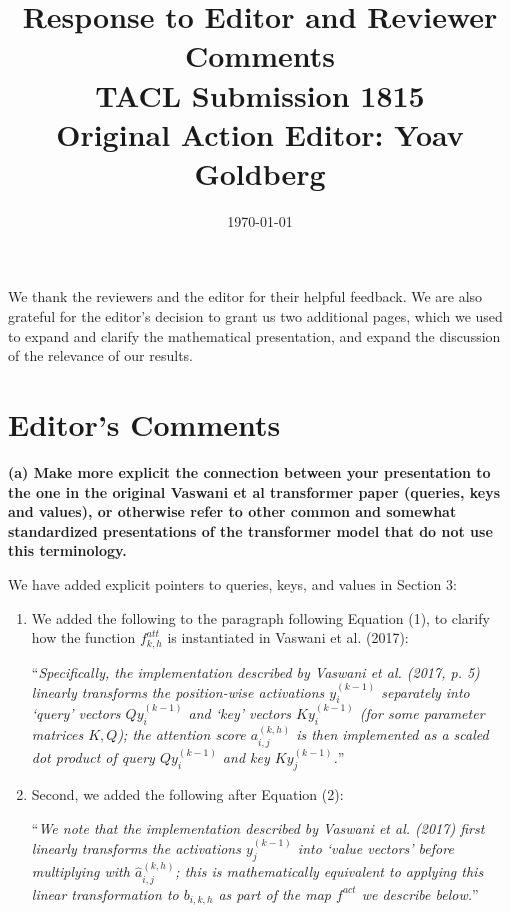 \documentclass[11pt,a4paper]{article}
\title{Response to Editor and Reviewer Comments \\ TACL Submission 1815 \\ Original Action Editor: Yoav Goldberg}
\date{\today}
\newcommand\response[1]{{\color{blue}#1}}
\newcommand\newtext[1]{``\textit{#1}''}
\newcommand\original[1]{\textbf{#1}}
\begin{document}
\maketitle 

\response{We thank the reviewers and the editor for their helpful feedback.
We are also grateful for the editor's decision to grant us two additional pages, which we used to expand and clarify the mathematical presentation, and expand the discussion of the relevance of our results.}

\section{Editor's Comments}

\original{(a) Make more explicit the connection between your presentation to the one
in the original Vaswani et al transformer paper (queries, keys and values),
or otherwise refer to other common and somewhat standardized presentations
of the transformer model that do not use this terminology.}

\response{We have added explicit pointers to queries, keys, and values in Section 3:}

\begin{enumerate}
    \item \response{We added the following to the paragraph following Equation (1), to clarify how the function $f^{att}_{k,h}$ is instantiated in Vaswani et al. (2017):}

\response{\newtext{Specifically, the implementation described by Vaswani et al. (2017, p. 5) linearly transforms the position-wise activations $y_i^{(k-1)}$ separately into `query' vectors $Q y_i^{(k-1)}$ and `key' vectors $K y_i^{(k-1)}$ (for some parameter matrices $K, Q$); the attention score $a_{i,j}^{(k,h)}$ is then implemented as a scaled dot product of query $Q y_i^{(k-1)}$ and key $K y_j^{(k-1)}$.}}
\newline

\item \response{Second, we added the following after Equation (2):}

\response{\newtext{We note that the implementation described by Vaswani et al. (2017) first linearly transforms the activations $y_j^{(k-1)}$ into `value vectors' before multiplying with $ \hat{a}_{i,j}^{(k,h)}$; this is mathematically equivalent to applying this linear transformation to $b_{i,k,h}$ as part of the map $f^{act}$ we describe below.}}
\end{enumerate}
\end{document}
